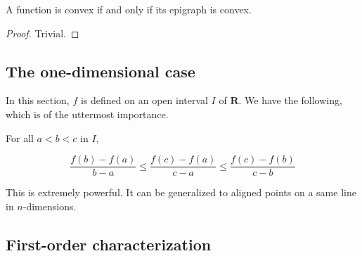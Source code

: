 \begin{proposition}
    A function is convex if and only if its epigraph is convex.
\end{proposition}

\begin{proof}
    Trivial.
\end{proof}

\subsection{The one-dimensional case}

In this section, $ f $ is defined on an open interval $ I $ of $ \mathbf R $. We have the following, which is of the uttermost importance.

\begin{theorem}\label{thm:slopes-inequality}
    For all $ a < b < c $ in $ I $,

    \[
        \frac{f(b) - f(a)}{b-a} \leqslant \frac{f(c)-f(a)}{c-a} \leqslant \frac{f(c)-f(b)}{c-b}
    \]
\end{theorem}

\begin{remark}
    This is extremely powerful. It can be generalized to aligned points on a same line in $ n $-dimensions.
\end{remark}

\subsection{First-order characterization}
